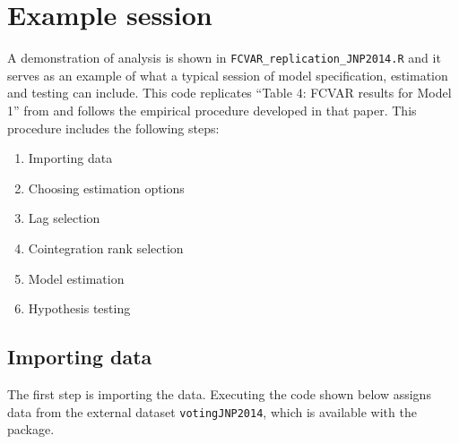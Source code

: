 \documentclass[article]{jss}
\begin{document}
\section{Example session} \label{sec:main}

A demonstration of analysis is shown in \verb|FCVAR_replication_JNP2014.R| and it serves as an example of what a typical session of model specification, estimation and testing can include. This code replicates ``Table 4: FCVAR results for Model 1'' from \cite{JNP2014} and follows the empirical procedure developed in that paper. This procedure includes the following steps:

\begin{enumerate}
\item Importing data
\item Choosing estimation options
\item Lag selection
\item Cointegration rank selection
\item Model estimation
\item Hypothesis testing
\end{enumerate}

% 

% 


\subsection{Importing data}

The first step is importing the data. Executing the code 
shown below assigns data from the external dataset \verb|votingJNP2014|, which is available with the package. 
\end{document}

